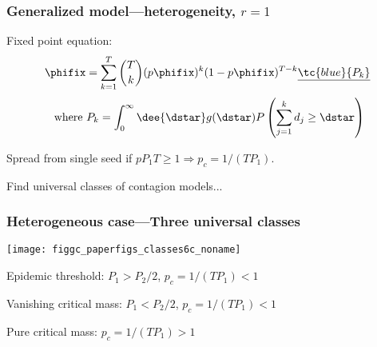\begin{frame}
  \frametitle{Generalized model---heterogeneity, $r=1$}



  Fixed point equation:
  $$
  \phifix
  =
  \sum_{k=1}^{T}
  \binom{T}{k}
  (p\phifix)^{k}
  (1-p\phifix)^{T-k}
  \underline{\tc{blue}{P_k}}
  $$
  $$ \hfill \ \mbox{where} \
  P_k
  =
  \int_{0}^{\infty} \dee{\dstar}
  g(\dstar)
  P\left(
    \sum_{j=1}^{k} d_j \ge \dstar
    \right)
  $$

  Spread from single seed if $p P_1 T \ge 1 \Rightarrow p_c = 1/(TP_1)$.

  Find \underline{} universal classes
  of contagion models...

\end{frame}

\begin{frame}
  \frametitle{Heterogeneous case---Three universal classes}

  \begin{center}
    \texttt{[image: figgc\_paperfigs\_classes6c\_noname]}
  \end{center}

  Epidemic threshold: \hfill $P_1 > P_2/2$, $p_c = 1/(TP_1) < 1$

  Vanishing critical mass: \hfill $P_1 < P_2/2$, $p_c = 1/(TP_1) < 1$

  Pure critical mass: \hfill $p_c = 1/(TP_1) > 1$

\end{frame}

% 
% 
% 

